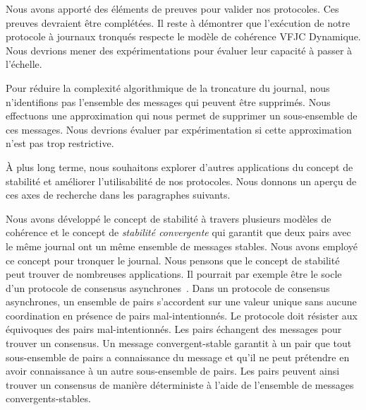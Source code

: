 
Nous avons apporté des éléments de preuves pour valider nos protocoles.
Ces preuves devraient être complétées.
Il reste à démontrer que l'exécution de notre protocole à journaux tronqués respecte le modèle de cohérence \acl{VFJC} Dynamique.
Nous devrions mener des expérimentations pour évaluer leur capacité à passer à l'échelle.

Pour réduire la complexité algorithmique de la troncature du journal, nous n'identifions pas l'ensemble des messages qui peuvent être supprimés.
Nous effectuons une approximation qui nous permet de supprimer un sous-ensemble de ces messages.
Nous devrions évaluer par expérimentation si cette approximation n'est pas trop restrictive.

À plus long terme, nous souhaitons explorer d'autres applications du concept de stabilité et améliorer l'utilisabilité de nos protocoles.
Nous donnons un aperçu de ces axes de recherche dans les paragraphes suivants.

Nous avons développé le concept de stabilité à travers plusieurs modèles de cohérence et le concept de \emph{stabilité convergente} qui garantit que deux pairs avec le même journal ont un même ensemble de messages stables.
Nous avons employé ce concept pour tronquer le journal.
Nous pensons que le concept de stabilité peut trouver de nombreuses applications.
Il pourrait par exemple être le socle d'un protocole de consensus asynchrones~\autocite{bracha1985asynchronous}.
Dans un protocole de consensus asynchrones, un ensemble de pairs s'accordent sur une valeur unique sans aucune coordination en présence de pairs mal-intentionnés.
Le protocole doit résister aux équivoques des pairs mal-intentionnés.
Les pairs échangent des messages pour trouver un consensus.
Un message convergent-stable garantit à un pair que tout sous-ensemble de pairs a connaissance du message et qu'il ne peut prétendre en avoir connaissance à un autre sous-ensemble de pairs.
Les pairs peuvent ainsi trouver un consensus de manière déterministe à l'aide de l'ensemble de messages convergents-stables.

